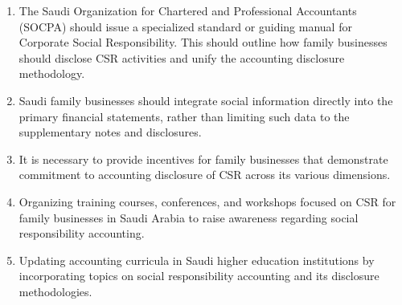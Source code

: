 \documentclass[10pt]{NSP1}
\begin{document}
\begin{enumerate}
  \item The Saudi Organization for Chartered and Professional Accountants (SOCPA) should issue a specialized standard or guiding manual for Corporate Social Responsibility. This should outline how family businesses should disclose CSR activities and unify the accounting disclosure methodology.
  \item Saudi family businesses should integrate social information directly into the primary financial statements, rather than limiting such data to the supplementary notes and disclosures.
  \item It is necessary to provide incentives for family businesses that demonstrate commitment to accounting disclosure of CSR across its various dimensions.
  \item Organizing training courses, conferences, and workshops focused on CSR for family businesses in Saudi Arabia to raise awareness regarding social responsibility accounting.
  \item Updating accounting curricula in Saudi higher education institutions by incorporating topics on social responsibility accounting and its disclosure methodologies.
\end{enumerate}
\end{document}
